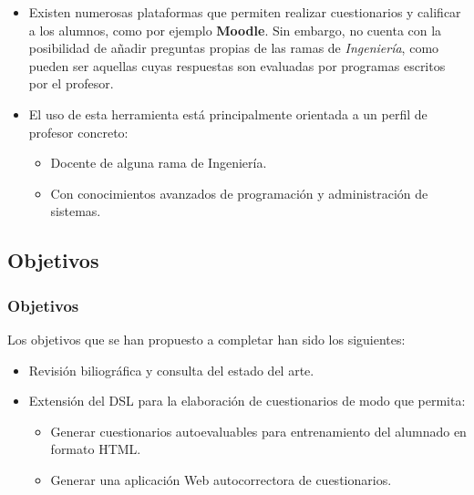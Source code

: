 \documentclass{beamer}
\begin{document}
\begin{frame}[allowframebreaks]
  \begin{itemize}
    \item Existen numerosas plataformas que permiten realizar cuestionarios y calificar a los alumnos, como por ejemplo {\bfseries Moodle}.
    Sin embargo, no cuenta con la posibilidad de añadir preguntas propias de las ramas de \textit{Ingeniería}, como pueden ser aquellas
    cuyas respuestas son evaluadas por programas escritos por el profesor.
    \item El uso de esta herramienta está principalmente orientada a un perfil de profesor concreto:
    \begin{itemize}
      \item Docente de alguna rama de Ingeniería.
      \item Con conocimientos avanzados de programación y administración de sistemas.
    \end{itemize}
  \end{itemize}
  
\end{frame}

\subsection{Objetivos}
\begin{frame}
  \frametitle{Objetivos}
  
  Los objetivos que se han propuesto a completar han sido los siguientes:
  \begin{itemize}
    \item Revisión biliográfica y consulta del estado del arte.
    \item Extensión del DSL para la elaboración de cuestionarios de modo que permita:
    \begin{itemize}
      \item Generar cuestionarios autoevaluables para entrenamiento del alumnado en formato HTML.
      \item Generar una aplicación Web autocorrectora de cuestionarios.
    \end{itemize}
  \end{itemize}
\end{frame}

\end{document}
